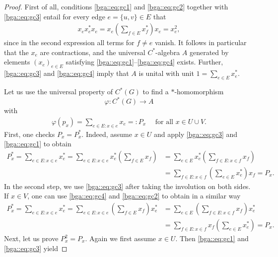 \documentclass[a4paper]{amsart}
\begin{document}
\begin{proof}
    First of all, conditions \eqref{bga::eq:gc1} and \eqref{bga::eq:gc2} together with \eqref{bga::eq:gc3} entail for every edge $e = \{u,v\} \in E$ that
    \begin{align*}
        x_e x_e^\ast x_e 
            = x_e \left( \sum_{f \in E} x_f^\ast \right) x_e
            = x_e^2,
    \end{align*}
    since in the second expression all terms for $f \neq e$ vanish. It follows in particular that the $x_e$ are contractions, and the universal $C^\ast$-algebra $A$ generated by elements $(x_e)_{e \in E}$ satisfying \eqref{bga::eq:gc1}--\eqref{bga::eq:gc4} exists. Further, \eqref{bga::eq:gc3} and \eqref{bga::eq:gc4} imply that $A$ is unital with unit $1 = \sum_{e \in E} x_e^\ast$.

    Let us use the universal property of $C^\ast(G)$ to find a $\ast$-homomorphism 
    $$
        \varphi: C^\ast(G) \to A
    $$ 
    with
    \begin{align*}
        \varphi(p_x) = \sum_{e \in E: x \in e} x_e =: P_x \quad \text{ for all } x \in U \cup V.
    \end{align*}
    First, one checks $P_x = P_x^\ast$. Indeed, assume $x \in U$ and apply \eqref{bga::eq:gc3} and \eqref{bga::eq:gc1} to obtain
    \begin{align*}
        P_x^\ast = \sum_{e \in E: x \in e} x_e^\ast 
            = \sum_{e \in E: x \in e} x_e^\ast \left( \sum_{f \in E} x_f \right) 
            &= \sum_{e \in E} x_e^\ast \left( \sum_{f \in E: x \in f} x_f \right) \\
            &= \sum_{f \in E: x \in f} \left(\sum_{e \in E} x_e^\ast\right) x_f 
            = P_x.
    \end{align*}
    In the second step, we use \eqref{bga::eq:gc3} after taking the involution on both sides.
    If $x \in V$, one can use \eqref{bga::eq:gc4} and \eqref{bga::eq:gc2} to obtain in a similar way
    \begin{align*}
        P_x^\ast = \sum_{e \in E: x \in e} x_e^\ast 
            = \sum_{e \in E: x \in e} \left( \sum_{f \in E} x_f \right) x_e^\ast 
            &= \sum_{e \in E} \left( \sum_{f \in E: x \in f} x_f \right) x_e^\ast \\
            &= \sum_{f \in E: x \in f} x_f \left( \sum_{e \in E} x_e^\ast \right) 
            = P_x.
    \end{align*}
    Next, let us prove $P_x^2 = P_x$. Again we first assume $x \in U$. Then \eqref{bga::eq:gc1} and \eqref{bga::eq:gc3} yield

\end{proof}
\end{document}

